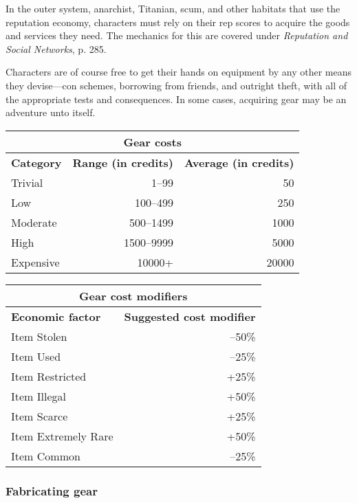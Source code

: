 In the outer system, anarchist, Titanian, scum, and
other habitats that use the reputation economy, characters
must rely on their rep scores to acquire the goods
and services they need. The mechanics for this are covered
under \emph{Reputation and Social Networks}, p. 285.

Characters are of course free to get their hands
on equipment by any other means they devise—con
schemes, borrowing from friends, and outright
theft, with all of the appropriate tests and consequences.
In some cases, acquiring gear may be an
adventure unto itself.

\begin{table}
\begin{tabular}{|l|r|r|}
\hline
\multicolumn{3}{|c|}{\textbf{Gear costs}}			\\
\hline
\textbf{Category}	& \textbf{Range (in credits)}	& \textbf{Average (in credits)} \\
\hline
Trivial			& 1–99					& 50 \\
\hline
Low				& 100–499					& 250 \\
\hline
Moderate			& 500–1499				& 1000 \\
\hline
High				& 1500–9999				& 5000 \\
\hline
Expensive			& 10000+					& 20000 \\
\hline
\end{tabular}
\label{tab:gear-costs}
\end{table}

\begin{table}
\begin{tabular}{|l|r|}
\hline
\multicolumn{2}{|c|}{\textbf{Gear cost modifiers}}			\\
\hline
\textbf{Economic factor}	& \textbf{Suggested cost modifier} \\
\hline
Item Stolen			& –50\% \\
\hline
Item Used				& –25\% \\
\hline
Item Restricted		& +25\% \\
\hline
Item Illegal			& +50\% \\
\hline
Item Scarce			& +25\% \\
\hline
Item Extremely Rare		& +50\% \\
\hline
Item Common			& –25\% \\
\hline
\end{tabular}
\label{tab:gear-cost-modifiers}
\end{table}

\subsubsection{Fabricating gear}

